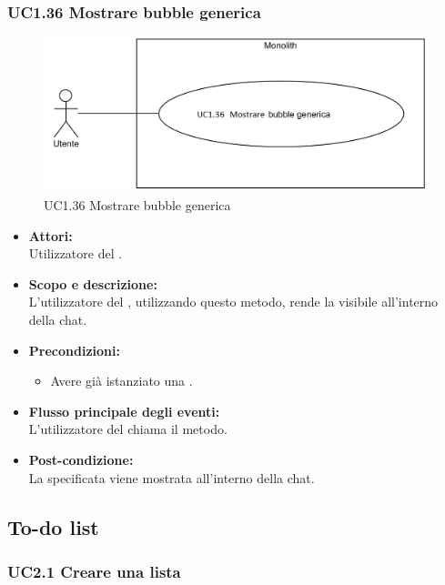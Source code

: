 \subsubsection{UC1.36 Mostrare bubble generica} \label{UC1.36}

\begin{figure}[H]
	\centering
	\includegraphics[width=15cm]{../../documenti/AnalisiDeiRequisiti/Diagrammi_img/uc1_36.png}
	\caption{UC1.36 Mostrare bubble generica}
\end{figure}

\begin{itemize}
	\item \textbf{Attori:}
	\\Utilizzatore del .
	\item \textbf{Scopo e descrizione:} 
	\\L'utilizzatore del , utilizzando questo metodo, rende la  visibile all'interno della chat.
	\item \textbf{Precondizioni:}
	\begin{itemize}
		\item Avere già istanziato una .
	\end{itemize}
	\item \textbf{Flusso principale degli eventi:}
	\\L'utilizzatore del  chiama il metodo.
	\item \textbf{Post-condizione:}
	\\La {} specificata viene mostrata all'interno della chat.
\end{itemize}

\subsection{To-do list}

\subsubsection{UC2.1 Creare una lista} \label{UC2.1}

